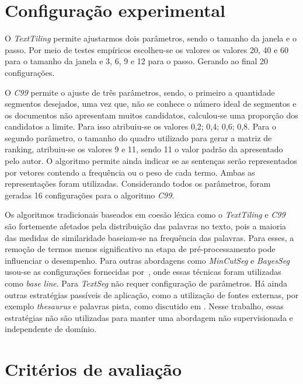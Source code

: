 \section{Configuração experimental}
\label{subsec:configuracaoexperimental}

  

O \textit{TextTiling} permite ajustarmos dois parâmetros, sendo o tamanho da janela e o passo. Por meio de testes empíricos escolheu-se os valores os valores 20, 40 e 60 para o tamanho da janela e 3, 6, 9 e 12 para o passo. Gerando ao final 20 configurações.
%

O \textit{C99} permite o ajuste de três parâmetros, sendo, o primeiro a quantidade segmentos desejados, uma vez que, não se conhece o número ideal de segmentos e os documentos não apresentam muitos candidatos, calculou-se uma proporção dos candidatos a limite. Para isso atribuiu-se os valores {0,2; 0,4; 0,6; 0,8}. Para o segundo parâmetro, o tamanho do quadro utilizado para gerar a matriz de ranking, atribuiu-se os valores 9 e 11, sendo 11 o valor padrão da apresentado pelo autor. O algoritmo permite ainda indicar se as sentenças serão representados por vetores contendo a frequência ou o peso de cada termo. Ambas as representações foram utilizadas. Considerando todos os parâmetros, foram geradas 16 configurações para o algoritmo \textit{C99}.

Os algoritmos tradicionais baseados em coesão léxica como o \textit{TextTiling} e \textit{C99} são fortemente afetados pela distribuição das palavras no texto, pois a maioria das medidas de similaridade baseiam-se na frequência das palavras. Para esses, a remoção de termos menos significativo na etapa de pré-processamento pode influenciar o desempenho. Para outras abordagens como \textit{MinCutSeg} e \textit{BayesSeg} usou-se as configurações fornecidas por~\cite{Eisenstein2008}, onde essas técnicas foram utilizadas como \textit{base line}. Para \textit{TextSeg} não requer configuração de parâmetros.
Há ainda outras estratégias passíveis de aplicação, como a utilização de fontes externas, por exemplo \textit{thesaurus} e palavras pista, como discutido em \cite{Naili2016, Gutierrez2016, Ferret2009}. Nesse trabalho, essas estratégias não são utilizadas para manter uma abordagem não supervisionada e independente de domínio. 
	

\section{Critérios de avaliação}

